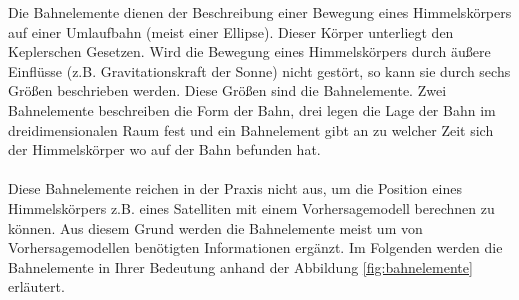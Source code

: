 Die Bahnelemente dienen der Beschreibung einer Bewegung eines Himmelskörpers auf einer Umlaufbahn (meist einer Ellipse). Dieser Körper unterliegt den Keplerschen Gesetzen. Wird die Bewegung eines Himmelskörpers durch äußere Einflüsse (z.B. Gravitationskraft der Sonne) nicht gestört, so kann sie durch sechs Größen beschrieben werden. Diese Größen sind die Bahnelemente. Zwei Bahnelemente beschreiben die Form der Bahn, drei legen die Lage der Bahn im dreidimensionalen Raum fest und ein Bahnelement gibt an zu welcher Zeit sich der Himmelskörper wo auf der Bahn befunden hat. 
\\\\Diese Bahnelemente reichen in der Praxis nicht aus, um die Position eines Himmelskörpers z.B. eines Satelliten mit einem Vorhersagemodell berechnen zu können. Aus diesem Grund werden die Bahnelemente meist um von Vorhersagemodellen benötigten Informationen ergänzt.       
Im Folgenden werden die Bahnelemente in Ihrer Bedeutung anhand der Abbildung \ref{fig:bahnelemente} erläutert. 

